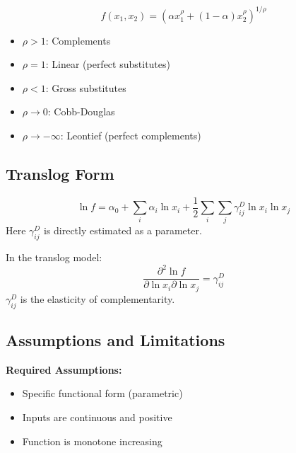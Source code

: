 \begin{definition}
\begin{equation}
f(x_1, x_2) = \left( \alpha x_1^\rho + (1-\alpha) x_2^\rho \right)^{1/\rho}
\end{equation}
\begin{itemize}
    \item $\rho > 1$: Complements
    \item $\rho = 1$: Linear (perfect substitutes)
    \item $\rho < 1$: Gross substitutes
    \item $\rho \to 0$: Cobb-Douglas
    \item $\rho \to -\infty$: Leontief (perfect complements)
\end{itemize}
\end{definition}

\subsection{Translog Form}

\begin{definition}
\begin{equation}
\ln f = \alpha_0 + \sum_i \alpha_i \ln x_i + \frac{1}{2} \sum_i \sum_j \gamma^D_{ij} \ln x_i \ln x_j
\label{eq:translog}
\end{equation}
Here $\gamma^D_{ij}$ is directly estimated as a parameter.
\end{definition}

\begin{theorem}
In the translog model:
\begin{equation}
\frac{\partial^2 \ln f}{\partial \ln x_i \partial \ln x_j} = \gamma^D_{ij}
\end{equation}
$\gamma^D_{ij}$ is the elasticity of complementarity.
\end{theorem}

\subsection{Assumptions and Limitations}

\textbf{Required Assumptions:}
\begin{itemize}
    \item Specific functional form (parametric)
    \item Inputs are continuous and positive
    \item Function is monotone increasing
\end{itemize}

